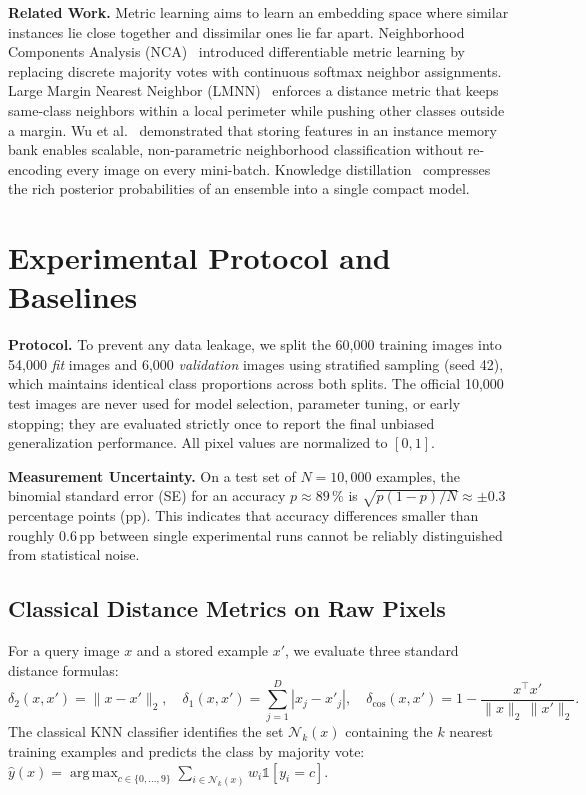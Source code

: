 \documentclass[10pt,a4paper]{article}
\DeclareMathOperator*{\argmax}{arg\,max}
\begin{document}
\textbf{Related Work.} Metric learning aims to learn an embedding space where similar instances lie close together and dissimilar ones lie far apart. Neighborhood Components Analysis (NCA)~\cite{goldberger2004} introduced differentiable metric learning by replacing discrete majority votes with continuous softmax neighbor assignments. Large Margin Nearest Neighbor (LMNN)~\cite{weinberger2009} enforces a distance metric that keeps same-class neighbors within a local perimeter while pushing other classes outside a margin. Wu et al.~\cite{wu2018unsup,wu2018snca} demonstrated that storing features in an instance memory bank enables scalable, non-parametric neighborhood classification without re-encoding every image on every mini-batch. Knowledge distillation~\cite{hinton2015} compresses the rich posterior probabilities of an ensemble into a single compact model.

\section{Experimental Protocol and Baselines}\label{sec:protocol}
\textbf{Protocol.} To prevent any data leakage, we split the 60{,}000 training images into 54{,}000 \emph{fit} images and 6{,}000 \emph{validation} images using stratified sampling (seed 42), which maintains identical class proportions across both splits. The official 10{,}000 test images are never used for model selection, parameter tuning, or early stopping; they are evaluated strictly once to report the final unbiased generalization performance. All pixel values are normalized to $[0, 1]$.

\textbf{Measurement Uncertainty.} On a test set of $N=10{,}000$ examples, the binomial standard error (SE) for an accuracy $p \approx 89\,\%$ is $\sqrt{p(1-p)/N} \approx \pm0.3$\,percentage points (pp). This indicates that accuracy differences smaller than roughly 0.6\,pp between single experimental runs cannot be reliably distinguished from statistical noise.

\subsection{Classical Distance Metrics on Raw Pixels}\label{sec:metrics}
For a query image $x$ and a stored example $x'$, we evaluate three standard distance formulas:
\begin{equation}
\delta_2(x,x') = \lVert x-x'\rVert_2, \quad
\delta_1(x,x') = \textstyle\sum_{j=1}^{D}|x_j-x'_j|, \quad
\delta_{\cos}(x,x') = 1-\frac{x^\top x'}{\lVert x\rVert_2\,\lVert x'\rVert_2}.
\end{equation}
The classical KNN classifier identifies the set $\mathcal{N}_k(x)$ containing the $k$ nearest training examples and predicts the class by majority vote: $\hat{y}(x)=\argmax_{c\in\{0,\dots,9\}}\sum_{i\in\mathcal{N}_k(x)} w_i \mathbb{1}[y_i=c]$.
\end{document}
